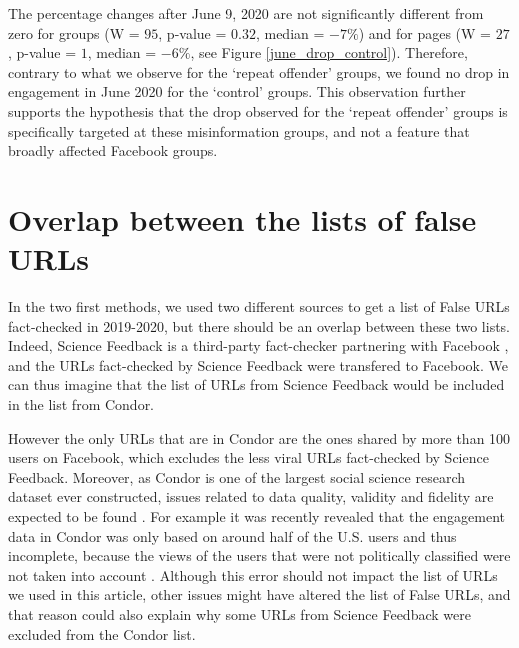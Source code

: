 \documentclass[review]{elsarticle}
\begin{document}
{{The percentage changes after June 9, 2020 are not significantly different from zero for groups (W = $95$, p-value = $0.32$, median = $-7\%$) and for pages (W = $27$, p-value = $1$, median = $-6\%$, see Figure \ref{june_drop_control}).
Therefore, contrary to what we observe for the `repeat offender' groups, we found no drop in engagement in June 2020 for the `control' groups.
This observation further supports the hypothesis that the drop observed for the `repeat offender' groups is specifically targeted at these misinformation groups, and not a feature that broadly affected Facebook groups.

\section*{Overlap between the lists of false URLs}

In the two first methods, we used two different sources to get a list of False URLs fact-checked in 2019-2020, but there should be an overlap between these two lists. 
Indeed, Science Feedback is a third-party fact-checker partnering with Facebook \citep{sciencefeedbackFbPartner}, and the URLs fact-checked by Science Feedback were transfered to Facebook.
We can thus imagine that the list of URLs from Science Feedback would be included in the list from Condor.

However the only URLs that are in Condor are the ones shared by more than 100 users on Facebook, which excludes the less viral URLs fact-checked by Science Feedback.
Moreover, as Condor is one of the largest social science research dataset ever constructed, issues related to data quality, validity and fidelity are expected to be found \cite{messing2020facebook}.
For example it was recently revealed that the engagement data in Condor was only based on around half of the U.S. users and thus incomplete, because the views of the users that were not politically classified were not taken into account \citep{NYTrevelations}. 
Although this error should not impact the list of URLs we used in this article, other issues might have altered the list of False URLs, and that reason could also explain why some URLs from Science Feedback were excluded from the Condor list.

}}
\end{document}

